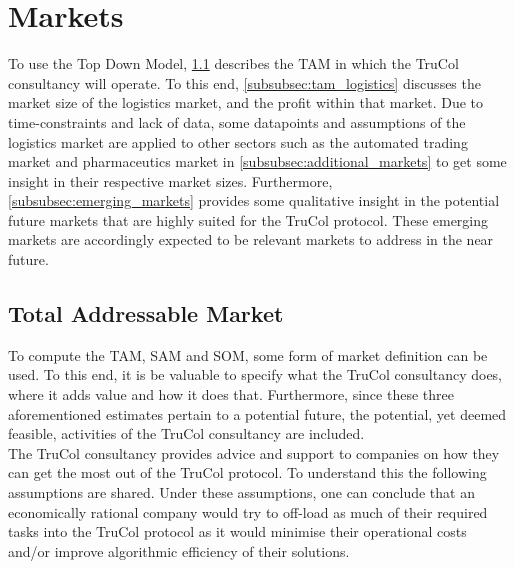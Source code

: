 \section{Markets}\label{sec:markets}


To use the Top Down Model, \cref{subsec:total_addressable_market} describes the TAM in which the TruCol consultancy will operate. To this end, \cref{subsubsec:tam_logistics} discusses the market size of the logistics market, and the profit within that market. Due to time-constraints and lack of data, some datapoints and assumptions of the logistics market are applied to other sectors such as the automated trading market and pharmaceutics market in \cref{subsubsec:additional_markets} to get some insight in their respective market sizes. Furthermore, \cref{subsubsec:emerging_markets} provides some qualitative insight in the potential future markets that are highly suited for the TruCol protocol. These emerging markets are accordingly expected to be relevant markets to address in the near future. 

\subsection{Total Addressable Market}\label{subsec:total_addressable_market}
To compute the TAM, SAM and SOM, some form of market definition can be used. To this end, it is be valuable to specify what the TruCol consultancy does, where it adds value and how it does that. Furthermore, since these three aforementioned estimates pertain to a potential future, the potential, yet deemed feasible, activities of the TruCol consultancy are included.
\\
The TruCol consultancy provides advice and support to companies on how they can get the most out of the TruCol protocol. To understand this the following assumptions are shared. Under these assumptions, one can conclude that an economically rational company would try to off-load as much of their required tasks into the TruCol protocol as it would minimise their operational costs and/or improve algorithmic efficiency of their solutions. 

